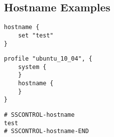 \subsection{Hostname Examples}

\begin{lstlisting}[style=Sscontrol,
label={lst:hostname_example_script},
title={Sets the host name.}]
hostname {
    set "test"
}
\end{lstlisting}

\begin{lstlisting}[style=Sscontrol,
label={lst:hostname_ubuntu_profile},
title={Ubuntu hostname profile.}]
profile "ubuntu_10_04", {
    system {
    }
    hostname {
    }
}
\end{lstlisting}

\begin{lstlisting}[style=rcfile_nonumbers,
label={lst:hostname_example},
title={Hostname configuration file example.}]
# SSCONTROL-hostname
test
# SSCONTROL-hostname-END
\end{lstlisting}

